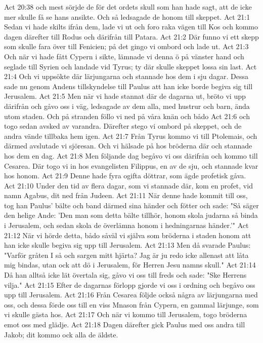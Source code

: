 Act 20:38  och mest sörjde de för det ordets skull som han hade sagt, att de icke mer skulle få se hans ansikte. Och så ledsagade de honom till skeppet.
Act 21:1  Sedan vi hade skilts ifrån dem, lade vi ut och foro raka vägen till Kos och kommo dagen därefter till Rodus och därifrån till Patara.
Act 21:2  Där funno vi ett skepp som skulle fara över till Fenicien; på det gingo vi ombord och lade ut.
Act 21:3  Och när vi hade fått Cypern i sikte, lämnade vi denna ö på vänster hand och seglade till Syrien och landade vid Tyrus; ty där skulle skeppet lossa sin last.
Act 21:4  Och vi uppsökte där lärjungarna och stannade hos dem i sju dagar. Dessa sade nu genom Andens tillskyndelse till Paulus att han icke borde begiva sig till Jerusalem.
Act 21:5  Men när vi hade stannat där de dagarna ut, bröto vi upp därifrån och gåvo oss i väg, ledsagade av dem alla, med hustrur och barn, ända utom staden. Och på stranden föllo vi ned på våra knän och bådo
Act 21:6  och togo sedan avsked av varandra. Därefter stego vi ombord på skeppet, och de andra vände tillbaka hem igen.
Act 21:7  Från Tyrus kommo vi till Ptolemais, och därmed avslutade vi sjöresan. Och vi hälsade på hos bröderna där och stannade hos dem en dag.
Act 21:8  Men följande dag begåvo vi oss därifrån och kommo till Cesarea. Där togo vi in hos evangelisten Filippus, en av de sju, och stannade kvar hos honom.
Act 21:9  Denne hade fyra ogifta döttrar, som ägde profetisk gåva.
Act 21:10  Under den tid av flera dagar, som vi stannade där, kom en profet, vid namn Agabus, dit ned från Judeen.
Act 21:11  När denne hade kommit till oss, tog han Paulus' bälte och band därmed sina händer och fötter och sade: "Så säger den helige Ande: 'Den man som detta bälte tillhör, honom skola judarna så binda i Jerusalem, och sedan skola de överlämna honom i hedningarnas händer.'"
Act 21:12  När vi hörde detta, bådo såväl vi själva som bröderna i staden honom att han icke skulle begiva sig upp till Jerusalem.
Act 21:13  Men då svarade Paulus: "Varför gråten I så och sargen mitt hjärta? Jag är ju redo icke allenast att låta mig bindas, utan ock att dö i Jerusalem, för Herren Jesu namns skull."
Act 21:14  Då han alltså icke lät övertala sig, gåvo vi oss till freds och sade: "Ske Herrens vilja."
Act 21:15  Efter de dagarnas förlopp gjorde vi oss i ordning och begåvo oss upp till Jerusalem.
Act 21:16  Från Cesarea följde också några av lärjungarna med oss, och dessa förde oss till en viss Mnason från Cypern, en gammal lärjunge, som vi skulle gästa hos.
Act 21:17  Och när vi kommo till Jerusalem, togo bröderna emot oss med glädje.
Act 21:18  Dagen därefter gick Paulus med oss andra till Jakob; dit kommo ock alla de äldste.
